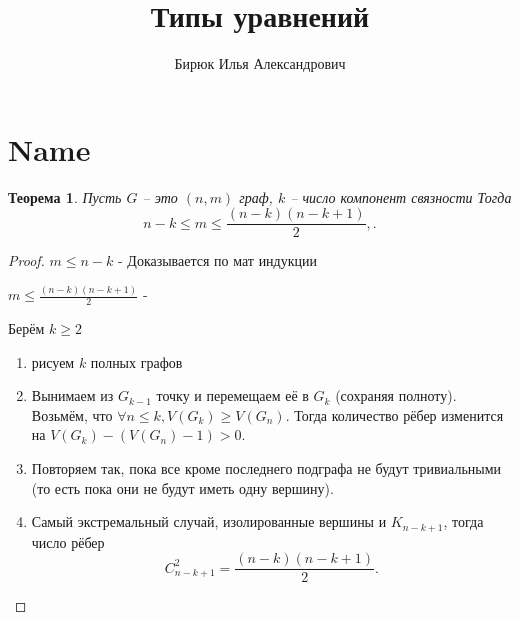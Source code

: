 \documentclass[a4paper, 12pt]{article}
\title{Типы уравнений}
\author{Бирюк Илья Александрович}
\newtheorem*{theorem*}{Теорема}
\theoremstyle{definition}
\renewcommand{\leq}{\leqslant}
\renewcommand{\geq}{\geqslant}
\begin{document}
  \maketitle
  \newpage
  \tableofcontents
  \newpage
  \section{Name}
  \begin{theorem*}
    Пусть $G$ -- это $(n,m)$ граф, $k$ -- число компонент связности
    Тогда
    $$n-k\leq{m}\leq\frac{(n-k)(n-k+1)}{2},.$$
  \end{theorem*}
  
  \begin{proof}
    $m\leq{n-k}$ - Доказывается по мат индукции
    
    $m\leq\frac{(n-k)(n-k+1)}{2}$ - 
    
    Берём $k\geq{2}$
    
    \begin{enumerate}
      \item рисуем $k$ полных графов
      
      \item Вынимаем из $G_{k-1}$ точку и перемещаем её в $G_k$ (сохраняя полноту). Возьмём, что $\forall n\le k, V(G_k)\geq V(G_n)$. Тогда количество рёбер изменится на $V(G_k)-(V(G_n)-1) > 0$.
      \item Повторяем так, пока все кроме последнего подграфа не будут тривиальными (то есть пока они не будут иметь одну вершину).
      \item Самый экстремальный случай, изолированные вершины и $K_{n-k+1}$, тогда число рёбер $$C^2_{n-k+1}=\frac{(n-k)(n-k+1)}{2}.$$ 
    \end{enumerate}
  \end{proof}
  
\end{document}
